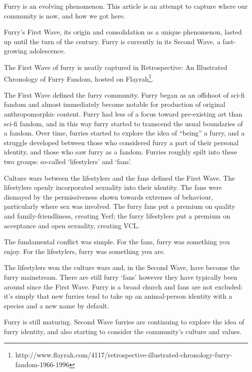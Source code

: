
Furry is an evolving phenomenon. This article is an attempt to capture where our community is now, and how we got here.

Furry's First Wave, its origin and consolidation as a unique phenomenon, lasted up until the turn of the century. Furry is currently in its Second Wave, a fast-growing adolescence.

The First Wave of furry is neatly captured in Retrospective: An Illustrated Chronology of Furry Fandom, hosted on Flayrah\footnote{http://www.flayrah.com/4117/retrospective-illustrated-chronology-furry-fandom-1966-1996}.

The First Wave defined the furry community. Furry began as an offshoot of sci-fi fandom and almost immediately become notable for production of original anthropomorphic content. Furry had less of a focus toward pre-existing art than sci-fi fandom, and in this way furry started to transcend the usual boundaries of a fandom. Over time, furries started to explore the idea of ``being'' a furry, and a struggle developed between those who considered furry a part of their personal identity, and those who saw furry as a fandom. Furries roughly spilt into these two groups: so-called `lifestylers' and `fans'.

Culture wars between the lifestylers and the fans defined the First Wave. The lifestylers openly incorporated sexuality into their identity. The fans were dismayed by the permissiveness shown towards extremes of behaviour, particularly where sex was involved. The furry fans put a premium on quality and family-friendliness, creating Yerf; the furry lifestylers put a premium on acceptance and open sexuality, creating VCL.

The fundamental conflict was simple. For the fans, furry was something you enjoy. For the lifestylers, furry was something you are.

The lifestylers won the culture wars and, in the Second Wave, have become the furry mainstream. There are still furry `fans' however they have typically been around since the First Wave. Furry is a broad church and fans are not excluded: it's simply that new furries tend to take up an animal-person identity with a species and a new name by default.

Furry is still maturing. Second Wave furries are continuing to explore the idea of furry identity, and also starting to consider the community's culture and values.

